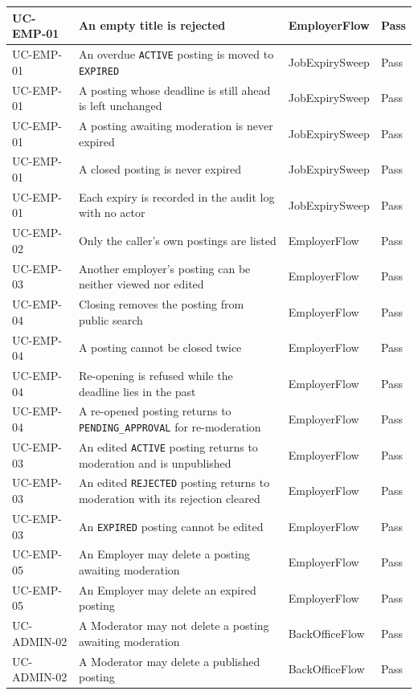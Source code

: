 \begin{longtable}{|>{\raggedright\arraybackslash}p{2.0cm}|>{\raggedright\arraybackslash}p{5.7cm}|>{\raggedright\arraybackslash}p{4.6cm}|>{\raggedright\arraybackslash}p{1.4cm}|}
	\hline
	UC-EMP-01 & An empty title is rejected & EmployerFlow & Pass \\
	\hline
	UC-EMP-01 & An overdue \texttt{ACTIVE} posting is moved to \texttt{EXPIRED} & JobExpirySweep & Pass \\
	\hline
	UC-EMP-01 & A posting whose deadline is still ahead is left unchanged & JobExpirySweep & Pass \\
	\hline
	UC-EMP-01 & A posting awaiting moderation is never expired & JobExpirySweep & Pass \\
	\hline
	UC-EMP-01 & A closed posting is never expired & JobExpirySweep & Pass \\
	\hline
	UC-EMP-01 & Each expiry is recorded in the audit log with no actor & JobExpirySweep & Pass \\
	\hline
	UC-EMP-02 & Only the caller's own postings are listed & EmployerFlow & Pass \\
	\hline
	UC-EMP-03 & Another employer's posting can be neither viewed nor edited & EmployerFlow & Pass \\
	\hline
	UC-EMP-04 & Closing removes the posting from public search & EmployerFlow & Pass \\
	\hline
	UC-EMP-04 & A posting cannot be closed twice & EmployerFlow & Pass \\
	\hline
	UC-EMP-04 & Re-opening is refused while the deadline lies in the past & EmployerFlow & Pass \\
	\hline
	UC-EMP-04 & A re-opened posting returns to \texttt{PENDING\_APPROVAL} for re-moderation & EmployerFlow & Pass \\
	\hline
	UC-EMP-03 & An edited \texttt{ACTIVE} posting returns to moderation and is unpublished & EmployerFlow & Pass \\
	\hline
	UC-EMP-03 & An edited \texttt{REJECTED} posting returns to moderation with its rejection cleared & EmployerFlow & Pass \\
	\hline
	UC-EMP-03 & An \texttt{EXPIRED} posting cannot be edited & EmployerFlow & Pass \\
	\hline
	UC-EMP-05 & An Employer may delete a posting awaiting moderation & EmployerFlow & Pass \\
	\hline
	UC-EMP-05 & An Employer may delete an expired posting & EmployerFlow & Pass \\
	\hline
	UC-ADMIN-02 & A Moderator may not delete a posting awaiting moderation & BackOfficeFlow & Pass \\
	\hline
	UC-ADMIN-02 & A Moderator may delete a published posting & BackOfficeFlow & Pass \\

\end{longtable}
